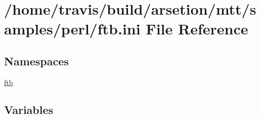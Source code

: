 \hypertarget{ftb_8ini}{\section{/home/travis/build/arsetion/mtt/samples/perl/ftb.ini File Reference}
\label{ftb_8ini}
}
\subsection*{Namespaces}
\begin{DoxyCompactItemize}
\item 
\hyperlink{namespaceftb}{ftb}
\end{DoxyCompactItemize}
\subsection*{Variables}
